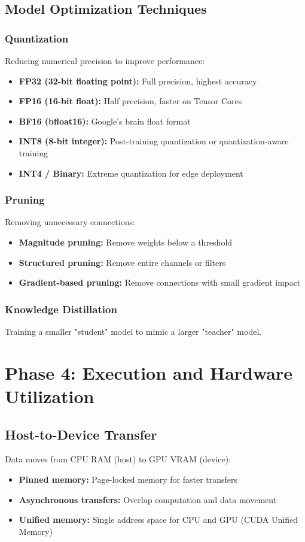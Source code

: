 \documentclass[11pt]{article}
\begin{document}
\subsection{Model Optimization Techniques}

\subsubsection{Quantization}
Reducing numerical precision to improve performance:

\begin{itemize}
    \item \textbf{FP32 (32-bit floating point):} Full precision, highest accuracy
    \item \textbf{FP16 (16-bit float):} Half precision, faster on Tensor Cores
    \item \textbf{BF16 (bfloat16):} Google's brain float format
    \item \textbf{INT8 (8-bit integer):} Post-training quantization or quantization-aware training
    \item \textbf{INT4 / Binary:} Extreme quantization for edge deployment
\end{itemize}

\subsubsection{Pruning}
Removing unnecessary connections:
\begin{itemize}
    \item \textbf{Magnitude pruning:} Remove weights below a threshold
    \item \textbf{Structured pruning:} Remove entire channels or filters
    \item \textbf{Gradient-based pruning:} Remove connections with small gradient impact
\end{itemize}

\subsubsection{Knowledge Distillation}
Training a smaller "student" model to mimic a larger "teacher" model.

\section{Phase 4: Execution and Hardware Utilization}

\subsection{Host-to-Device Transfer}
Data moves from CPU RAM (host) to GPU VRAM (device):
\begin{itemize}
    \item \textbf{Pinned memory:} Page-locked memory for faster transfers
    \item \textbf{Asynchronous transfers:} Overlap computation and data movement
    \item \textbf{Unified memory:} Single address space for CPU and GPU (CUDA Unified Memory)
\end{itemize}
\end{document}
